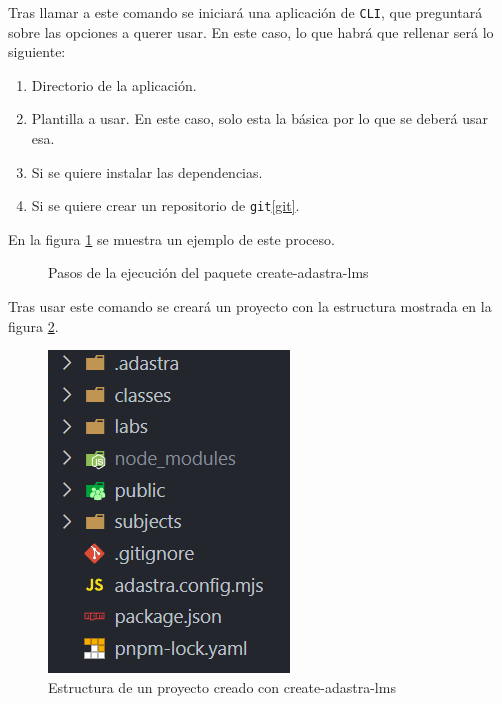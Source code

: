Tras llamar a este comando se iniciará una aplicación de \verb|CLI|\cite{cli}, que preguntará sobre las opciones a querer usar. En este caso, lo que habrá que rellenar será lo siguiente:

\begin{enumerate}
    \item Directorio de la aplicación.
    \item Plantilla a usar. En este caso, solo esta la básica por lo que se deberá usar esa.
    \item Si se quiere instalar las dependencias.
    \item Si se quiere crear un repositorio de \verb|git|\ref{git}.
\end{enumerate}

En la figura \ref{fig:create-adastra} se  muestra un ejemplo de este proceso.

\begin{figure}
    \centering
    \caption{Pasos de la ejecución del paquete create-adastra-lms}
    \label{fig:create-adastra}
\end{figure}

Tras usar este comando se creará un proyecto con la estructura mostrada en la figura \ref{fig:adastra-structure}.

\begin{figure}[H]
    \centering
    \includegraphics{images/projectStructure.png}
    \caption{Estructura de un proyecto creado con create-adastra-lms}
    \label{fig:adastra-structure}
\end{figure}

